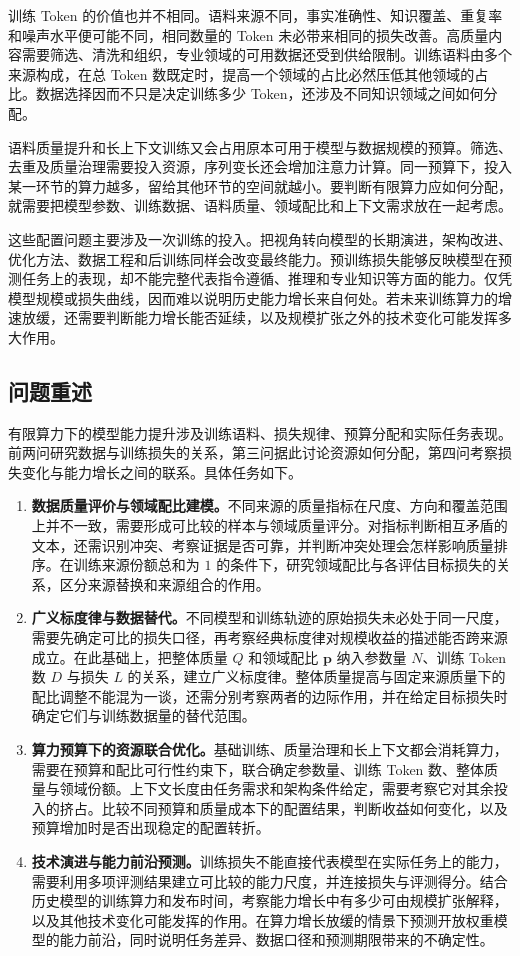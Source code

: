 \documentclass[bwprint]{gmcmthesis}
\begin{document}
训练 Token 的价值也并不相同。语料来源不同，事实准确性、知识覆盖、重复率和噪声水平便可能不同，相同数量的 Token 未必带来相同的损失改善。高质量内容需要筛选、清洗和组织，专业领域的可用数据还受到供给限制。训练语料由多个来源构成，在总 Token 数既定时，提高一个领域的占比必然压低其他领域的占比。数据选择因而不只是决定训练多少 Token，还涉及不同知识领域之间如何分配。

语料质量提升和长上下文训练又会占用原本可用于模型与数据规模的预算。筛选、去重及质量治理需要投入资源，序列变长还会增加注意力计算。同一预算下，投入某一环节的算力越多，留给其他环节的空间就越小。要判断有限算力应如何分配，就需要把模型参数、训练数据、语料质量、领域配比和上下文需求放在一起考虑。

这些配置问题主要涉及一次训练的投入。把视角转向模型的长期演进，架构改进、优化方法、数据工程和后训练同样会改变最终能力。预训练损失能够反映模型在预测任务上的表现，却不能完整代表指令遵循、推理和专业知识等方面的能力。仅凭模型规模或损失曲线，因而难以说明历史能力增长来自何处。若未来训练算力的增速放缓，还需要判断能力增长能否延续，以及规模扩张之外的技术变化可能发挥多大作用。

\subsection{问题重述}
有限算力下的模型能力提升涉及训练语料、损失规律、预算分配和实际任务表现。前两问研究数据与训练损失的关系，第三问据此讨论资源如何分配，第四问考察损失变化与能力增长之间的联系。具体任务如下。
\begin{enumerate}
    \item \textbf{数据质量评价与领域配比建模。}不同来源的质量指标在尺度、方向和覆盖范围上并不一致，需要形成可比较的样本与领域质量评分。对指标判断相互矛盾的文本，还需识别冲突、考察证据是否可靠，并判断冲突处理会怎样影响质量排序。在训练来源份额总和为 $1$ 的条件下，研究领域配比与各评估目标损失的关系，区分来源替换和来源组合的作用。
    \item \textbf{广义标度律与数据替代。}不同模型和训练轨迹的原始损失未必处于同一尺度，需要先确定可比的损失口径，再考察经典标度律对规模收益的描述能否跨来源成立。在此基础上，把整体质量 $Q$ 和领域配比 $\mathbf p$ 纳入参数量 $N$、训练 Token 数 $D$ 与损失 $L$ 的关系，建立广义标度律。整体质量提高与固定来源质量下的配比调整不能混为一谈，还需分别考察两者的边际作用，并在给定目标损失时确定它们与训练数据量的替代范围。
    \item \textbf{算力预算下的资源联合优化。}基础训练、质量治理和长上下文都会消耗算力，需要在预算和配比可行性约束下，联合确定参数量、训练 Token 数、整体质量与领域份额。上下文长度由任务需求和架构条件给定，需要考察它对其余投入的挤占。比较不同预算和质量成本下的配置结果，判断收益如何变化，以及预算增加时是否出现稳定的配置转折。
    \item \textbf{技术演进与能力前沿预测。}训练损失不能直接代表模型在实际任务上的能力，需要利用多项评测结果建立可比较的能力尺度，并连接损失与评测得分。结合历史模型的训练算力和发布时间，考察能力增长中有多少可由规模扩张解释，以及其他技术变化可能发挥的作用。在算力增长放缓的情景下预测开放权重模型的能力前沿，同时说明任务差异、数据口径和预测期限带来的不确定性。
\end{enumerate}
\end{document}

